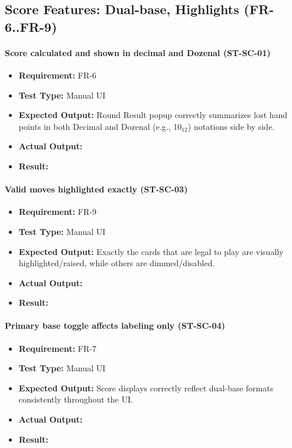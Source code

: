 \documentclass[12pt, titlepage]{article}
\begin{document}
\subsection{Score Features: Dual-base, Highlights (FR-6..FR-9)}

\paragraph{Score calculated and shown in decimal and Dozenal (ST-SC-01)}
\begin{itemize}
  \item \textbf{Requirement:} FR-6
  \item \textbf{Test Type:} Manual UI
  \item \textbf{Expected Output:} Round Result popup correctly summarizes lost hand points in both Decimal and Dozenal (e.g., 10$_{12}$) notations side by side.
  \item \textbf{Actual Output:} 
  \item \textbf{Result:} 
\end{itemize}

\paragraph{Valid moves highlighted exactly (ST-SC-03)}
\begin{itemize}
  \item \textbf{Requirement:} FR-9
  \item \textbf{Test Type:} Manual UI
  \item \textbf{Expected Output:} Exactly the cards that are legal to play are visually highlighted/raised, while others are dimmed/disabled.
  \item \textbf{Actual Output:} 
  \item \textbf{Result:} 
\end{itemize}

\paragraph{Primary base toggle affects labeling only (ST-SC-04)}
\begin{itemize}
  \item \textbf{Requirement:} FR-7
  \item \textbf{Test Type:} Manual UI
  \item \textbf{Expected Output:} Score displays correctly reflect dual-base formats consistently throughout the UI.
  \item \textbf{Actual Output:} 
  \item \textbf{Result:} 
\end{itemize}
\end{document}
